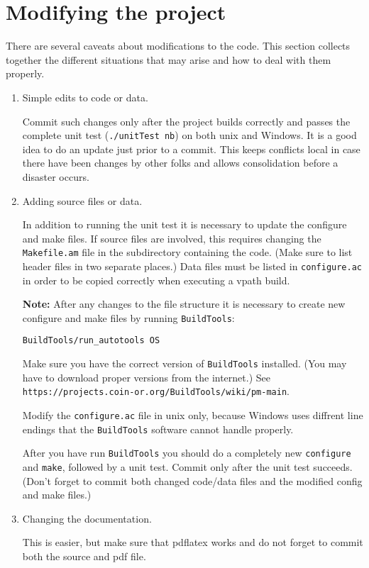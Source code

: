 \section{Modifying the project}\label{section:ModifyingProject} 

There are several caveats about modifications to the code. This section collects together the different situations that may arise and how to deal with them properly.

\begin{enumerate}

\item Simple edits to code or data.

Commit such changes only after the project builds correctly and passes the complete unit test 
({\tt ./unitTest nb}) on both unix and Windows. It is a good idea to do an update just prior to a commit. This keeps conflicts local in case there have been changes by other folks and allows consolidation before a disaster occurs. 

\item Adding source files or data.

In addition to running the unit test it is necessary to update the configure and make files. 
If source files are involved, this requires changing the {\tt Makefile.am} file in the subdirectory 
containing the code. (Make sure to list header files in two separate places.) Data files must be listed in 
{\tt configure.ac} in order to be copied correctly when executing a vpath build. 


{\bf Note:} After any changes to the file structure it is necessary to create new configure and make files by running {\tt BuildTools}:
\begin{verbatim}
BuildTools/run_autotools OS
\end{verbatim}

Make sure you have the correct version of {\tt BuildTools} installed. (You may have to download proper versions from the internet.) See {\tt https://projects.coin-or.org/BuildTools/wiki/pm-main}.

Modify the {\tt configure.ac} file in unix only, because Windows uses diffrent line endings that the 
{\tt BuildTools} software cannot handle properly. 


After you have run {\tt BuildTools} you should do a completely new {\tt configure} and {\tt make}, followed by a unit test. Commit only after the unit test succeeds. (Don't forget to commit both changed code/data files and the modified config and make files.)

\item Changing the documentation.

This is easier, but make sure that pdflatex works and do not forget to commit both the source and pdf file. 

\end{enumerate}

